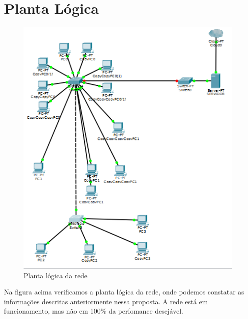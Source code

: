 \documentclass[12pt, a4paper]{article}
\begin{document}
	\section{Planta Lógica}
	\FloatBarrier
	\begin{figure}[!htp]
		\centering
		\includegraphics[scale=0.7]{unnamed0.png}
		\caption{Planta lógica da rede}
	\end{figure}
	\FloatBarrier
	\par 
	Na figura acima verificamos a planta lógica da rede, onde podemos constatar as informações descritas anteriormente nessa proposta. A rede está em funcionamento, mas não em 100\% da perfomance desejável. 
\end{document}
